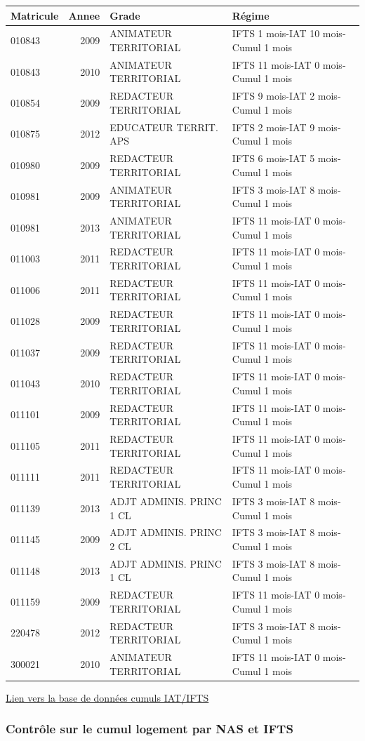 \begin{longtable}[]{@{}lrll@{}}
\toprule
Matricule & Annee & Grade & Régime\tabularnewline
\midrule
\endhead
010843 & 2009 & ANIMATEUR TERRITORIAL & IFTS 1 mois-IAT 10 mois-Cumul 1
mois\tabularnewline
010843 & 2010 & ANIMATEUR TERRITORIAL & IFTS 11 mois-IAT 0 mois-Cumul 1
mois\tabularnewline
010854 & 2009 & REDACTEUR TERRITORIAL & IFTS 9 mois-IAT 2 mois-Cumul 1
mois\tabularnewline
010875 & 2012 & EDUCATEUR TERRIT. APS & IFTS 2 mois-IAT 9 mois-Cumul 1
mois\tabularnewline
010980 & 2009 & REDACTEUR TERRITORIAL & IFTS 6 mois-IAT 5 mois-Cumul 1
mois\tabularnewline
010981 & 2009 & ANIMATEUR TERRITORIAL & IFTS 3 mois-IAT 8 mois-Cumul 1
mois\tabularnewline
010981 & 2013 & ANIMATEUR TERRITORIAL & IFTS 11 mois-IAT 0 mois-Cumul 1
mois\tabularnewline
011003 & 2011 & REDACTEUR TERRITORIAL & IFTS 11 mois-IAT 0 mois-Cumul 1
mois\tabularnewline
011006 & 2011 & REDACTEUR TERRITORIAL & IFTS 11 mois-IAT 0 mois-Cumul 1
mois\tabularnewline
011028 & 2009 & REDACTEUR TERRITORIAL & IFTS 11 mois-IAT 0 mois-Cumul 1
mois\tabularnewline
011037 & 2009 & REDACTEUR TERRITORIAL & IFTS 11 mois-IAT 0 mois-Cumul 1
mois\tabularnewline
011043 & 2010 & REDACTEUR TERRITORIAL & IFTS 11 mois-IAT 0 mois-Cumul 1
mois\tabularnewline
011101 & 2009 & REDACTEUR TERRITORIAL & IFTS 11 mois-IAT 0 mois-Cumul 1
mois\tabularnewline
011105 & 2011 & REDACTEUR TERRITORIAL & IFTS 11 mois-IAT 0 mois-Cumul 1
mois\tabularnewline
011111 & 2011 & REDACTEUR TERRITORIAL & IFTS 11 mois-IAT 0 mois-Cumul 1
mois\tabularnewline
011139 & 2013 & ADJT ADMINIS. PRINC 1 CL & IFTS 3 mois-IAT 8 mois-Cumul
1 mois\tabularnewline
011145 & 2009 & ADJT ADMINIS. PRINC 2 CL & IFTS 3 mois-IAT 8 mois-Cumul
1 mois\tabularnewline
011148 & 2013 & ADJT ADMINIS. PRINC 1 CL & IFTS 3 mois-IAT 8 mois-Cumul
1 mois\tabularnewline
011159 & 2009 & REDACTEUR TERRITORIAL & IFTS 11 mois-IAT 0 mois-Cumul 1
mois\tabularnewline
220478 & 2012 & REDACTEUR TERRITORIAL & IFTS 3 mois-IAT 8 mois-Cumul 1
mois\tabularnewline
300021 & 2010 & ANIMATEUR TERRITORIAL & IFTS 11 mois-IAT 0 mois-Cumul 1
mois\tabularnewline
\bottomrule
\end{longtable}

\href{../Bases/Reglementation/personnels.iat.ifts.csv}{Lien vers la base de
données cumuls IAT/IFTS}

\hypertarget{controle-sur-le-cumul-logement-par-nas-et-ifts}{%
\subsubsection{Contrôle sur le cumul logement par NAS et
IFTS}\label{controle-sur-le-cumul-logement-par-nas-et-ifts}}

